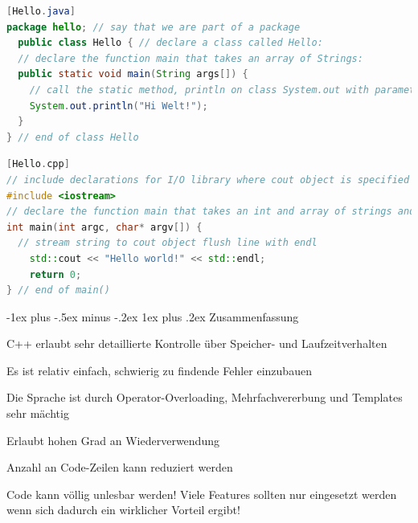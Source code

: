 \documentclass[10pt]{article}
\makeatletter
\renewcommand{\subsubsection}{\@startsection{subsubsection}{3}{0mm}%
                                {-1ex plus -.5ex minus -.2ex}%
                                {1ex plus .2ex}%
                                {\normalfont\small\bfseries}}
\makeatother
\begin{document}
\begin{lstlisting}[language=java]
[Hello.java] 
package hello; // say that we are part of a package
  public class Hello { // declare a class called Hello:
  // declare the function main that takes an array of Strings:
  public static void main(String args[]) {
    // call the static method, println on class System.out with parameter "Hi Welt!":
    System.out.println("Hi Welt!");
  }
} // end of class Hello
\end{lstlisting}

\begin{lstlisting}[language=C++]
[Hello.cpp]
// include declarations for I/O library where cout object is specified in namespace std::
#include <iostream>
// declare the function main that takes an int and array of strings and returns an int as the exit code
int main(int argc, char* argv[]) {
  // stream string to cout object flush line with endl
    std::cout << "Hello world!" << std::endl;
    return 0;
} // end of main()
\end{lstlisting}

\subsubsection{Zusammenfassung}
\begin{itemize*}
  \item C++ erlaubt sehr detaillierte Kontrolle über Speicher- und Laufzeitverhalten
  \item Es ist relativ einfach, schwierig zu findende Fehler einzubauen
  \item Die Sprache ist durch Operator-Overloading, Mehrfachvererbung und Templates sehr mächtig
  \item Erlaubt hohen Grad an Wiederverwendung
  \item Anzahl an Code-Zeilen kann reduziert werden
  \item Code kann völlig unlesbar werden! Viele Features sollten nur eingesetzt werden wenn sich dadurch ein wirklicher Vorteil ergibt!
\end{itemize*}
\end{document}
